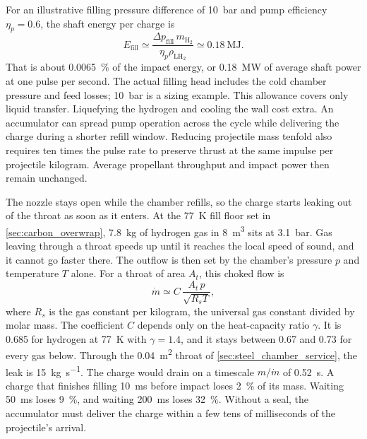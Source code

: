 \documentclass{article}
\begin{document}
For an illustrative filling pressure difference of \SI{10}{\bar} and pump efficiency $\eta_p=0.6$, the shaft energy per charge is
\begin{equation}\label{eq:batch_fill_pump}
    E_{\mathrm{fill}}\simeq\frac{\Delta p_{\mathrm{fill}}\,m_{\mathrm{H_2}}}
    {\eta_p\rho_{\mathrm{LH_2}}}
    \simeq\SI{0.18}{\mega\joule}.
\end{equation}
That is about \SI{0.0065}{\percent} of the impact energy, or \SI{0.18}{\mega\watt} of average shaft power at one pulse per second. The actual filling head includes the cold chamber pressure and feed losses; \SI{10}{\bar} is a sizing example. This allowance covers only liquid transfer. Liquefying the hydrogen and cooling the wall cost extra. An accumulator can spread pump operation across the cycle while delivering the charge during a shorter refill window. Reducing projectile mass tenfold also requires ten times the pulse rate to preserve thrust at the same impulse per projectile kilogram. Average propellant throughput and impact power then remain unchanged.

The nozzle stays open while the chamber refills, so the charge starts leaking out of the throat as soon as it enters. At the \SI{77}{\kelvin} fill floor set in \autoref{sec:carbon_overwrap}, \SI{7.8}{\kilogram} of hydrogen gas in \SI{8}{\cubic\meter} sits at \SI{3.1}{\bar}. Gas leaving through a throat speeds up until it reaches the local speed of sound, and it cannot go faster there. The outflow is then set by the chamber's pressure $p$ and temperature $T$ alone. For a throat of area $A_t$, this choked flow is
\begin{equation}\label{eq:throat_leak}
    \dot{m} \simeq C\,\frac{A_t\,p}{\sqrt{R_sT}},
\end{equation}
where $R_s$ is the gas constant per kilogram, the universal gas constant divided by molar mass. The coefficient $C$ depends only on the heat-capacity ratio $\gamma$. It is 0.685 for hydrogen at \SI{77}{\kelvin} with $\gamma=1.4$, and it stays between 0.67 and 0.73 for every gas below. Through the \SI{0.04}{\square\meter} throat of \autoref{sec:steel_chamber_service}, the leak is \SI{15}{\kilogram\per\second}. The charge would drain on a timescale $m/\dot{m}$ of \SI{0.52}{\second}. A charge that finishes filling \SI{10}{\milli\second} before impact loses \SI{2}{\percent} of its mass. Waiting \SI{50}{\milli\second} loses \SI{9}{\percent}, and waiting \SI{200}{\milli\second} loses \SI{32}{\percent}. Without a seal, the accumulator must deliver the charge within a few tens of milliseconds of the projectile's arrival.
\end{document}
